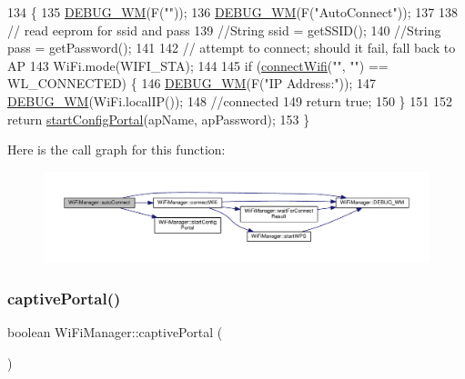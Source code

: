 \begin{DoxyCode}
134                                                                            \{
135   \hyperlink{class_wi_fi_manager_ae5f595c670ccbcf9a191baf50f5c7c26}{DEBUG\_WM}(F(\textcolor{stringliteral}{""}));
136   \hyperlink{class_wi_fi_manager_ae5f595c670ccbcf9a191baf50f5c7c26}{DEBUG\_WM}(F(\textcolor{stringliteral}{"AutoConnect"}));
137 
138   \textcolor{comment}{// read eeprom for ssid and pass}
139   \textcolor{comment}{//String ssid = getSSID();}
140   \textcolor{comment}{//String pass = getPassword();}
141 
142   \textcolor{comment}{// attempt to connect; should it fail, fall back to AP}
143   WiFi.mode(WIFI\_STA);
144 
145   \textcolor{keywordflow}{if} (\hyperlink{class_wi_fi_manager_ae0ae27b5543b47585728c084c3bbdca7}{connectWifi}(\textcolor{stringliteral}{""}, \textcolor{stringliteral}{""}) == WL\_CONNECTED)   \{
146     \hyperlink{class_wi_fi_manager_ae5f595c670ccbcf9a191baf50f5c7c26}{DEBUG\_WM}(F(\textcolor{stringliteral}{"IP Address:"}));
147     \hyperlink{class_wi_fi_manager_ae5f595c670ccbcf9a191baf50f5c7c26}{DEBUG\_WM}(WiFi.localIP());
148     \textcolor{comment}{//connected}
149     \textcolor{keywordflow}{return} \textcolor{keyword}{true};
150   \}
151 
152   \textcolor{keywordflow}{return} \hyperlink{class_wi_fi_manager_ad781751307f7f623956126096a09a545}{startConfigPortal}(apName, apPassword);
153 \}
\end{DoxyCode}
Here is the call graph for this function\+:\nopagebreak
\begin{figure}[H]
\begin{center}
\leavevmode
\includegraphics[width=350pt]{d4/dc8/class_wi_fi_manager_ab1d094034e5e3e36e2e1b3624edad469_cgraph}
\end{center}
\end{figure}
\mbox{\label{class_wi_fi_manager_a4ef4298deb224212e5242c456669a973}} 
\subsubsection{\texorpdfstring{captive\+Portal()}{captivePortal()}}
{\footnotesize\ttfamily boolean Wi\+Fi\+Manager\+::captive\+Portal (\begin{DoxyParamCaption}{ }\end{DoxyParamCaption})\hspace{0.3cm}{\ttfamily [private]}}

